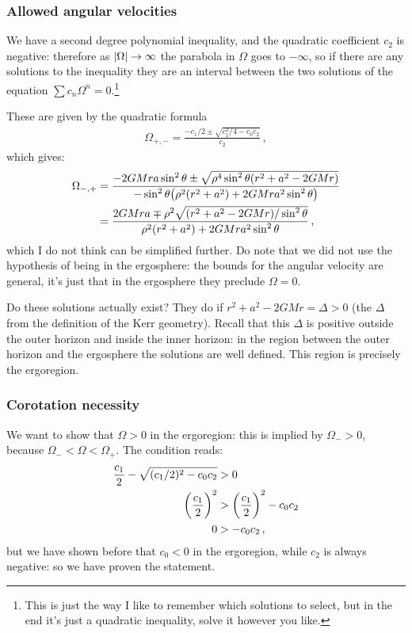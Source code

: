 \documentclass[main.tex]{subfiles}
\begin{document}
\subsubsection{Allowed angular velocities}

We have a second degree polynomial inequality, and the quadratic coefficient \(c_2 \) is negative: therefore as \(\abs{\Omega } \rightarrow \infty \) the parabola in \(\Omega \) goes to \(- \infty \), so if there are any solutions to the inequality they are an interval between the two solutions of the equation \(\sum c_{n} \Omega^{n} = 0\).\footnote{This is just the way I like to remember which solutions to select, but in the end it's just a quadratic inequality, solve it however you like.}

These are given by the quadratic formula 
%
\begin{align}
  \Omega_{+, -} = \frac{- c_1/2 \pm \sqrt{c_1^2/4- c_0 c_2  }}{c_2 }
\,,
\end{align}
%
which gives: 
%
\begin{align}
\Omega_{-,+} &= \frac{-2GMra \sin^2\theta \pm \sqrt{\rho^4 \sin^{2}\theta \qty(r^2+a^2-2GMr)}}{- \sin^2\theta \qty(\rho^2(r^2+a^2)+2GMra^2 \sin^2\theta )}  \\
&= \frac{2GMra \mp \rho^2 \sqrt{ \qty(r^2+a^2-2GMr) / \sin^2 \theta }}{\rho^2(r^2+a^2)+2GMra^2 \sin^2\theta }
\,,
\end{align}
%
which I do not think can be simplified further. 
Do note that we did not use the hypothesis of being in the ergosphere: the bounds for the angular velocity are general, it's just that in the ergosphere they preclude \(\Omega = 0\). 

Do these solutions actually exist? They do if \(r^2+a^2-2GMr = \Delta >0\) (the \(\Delta \) from the definition of the Kerr geometry). Recall that this \(\Delta \) is positive outside the outer horizon and inside the inner horizon: in the region between the outer horizon and the ergosphere the solutions are well defined. 
This region is precisely the ergoregion. 

\subsubsection{Corotation necessity}

We want to show that \(\Omega>0\) in the ergoregion: this is implied by \(\Omega_{-} > 0\), because \(\Omega_{-} < \Omega < \Omega_{+}\). The condition reads: 
%
\begin{align}
\frac{c_1}{2} - \sqrt{(c_1 /2)^2 - c_0 c_2 } &> 0  \\
\qty(\frac{c_1}{2})^2 &> \qty(\frac{c_1}{2})^2 - c_0 c_2   \\
0 &> -c_0 c_2 
\,,
\end{align}
%
but we have shown before that \(c_0 < 0\) in the ergoregion, while \(c_2 \) is always negative: so we have proven the statement. 
\end{document}
